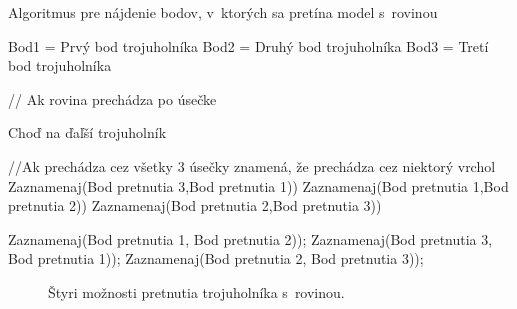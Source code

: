 \begin{algorithm}[]
\caption{Algoritmus pre nájdenie bodov, v~ktorých sa pretína model s~rovinou}\label{FindCollides}
\begin{algorithmic}[1]
    	\State Bod1 = Prvý bod trojuholníka
    	\State Bod2 = Druhý bod trojuholníka
    	\State Bod3 = Tretí bod trojuholníka
      
        // Ak rovina prechádza po úsečke
      \EndIf
      \EndIf
      \EndIf
      
      	\State Choď na ďaľší trojuholník
      \EndIf
      
            
      //Ak prechádza cez všetky 3 úsečky znamená, že prechádza cez niektorý vrchol
        	\State Zaznamenaj(Bod pretnutia 3,Bod pretnutia 1))
        \EndIf
        	\State Zaznamenaj(Bod pretnutia 1,Bod pretnutia 2))
        \EndIf
        	\State Zaznamenaj(Bod pretnutia 2,Bod pretnutia 3))
        \EndIf
      
      \EndIf
      
            \State Zaznamenaj(Bod pretnutia 1, Bod pretnutia 2));
          \EndIf  
              \State Zaznamenaj(Bod pretnutia 3, Bod pretnutia 1));
          \EndIf
              \State Zaznamenaj(Bod pretnutia 2,  Bod pretnutia 3));
          \EndIf
      \EndIf
    \EndFor
  \EndFunction
\end{algorithmic}
\end{algorithm}

\begin{figure}[H]
\centering
{}
\caption{Štyri možnosti pretnutia trojuholníka s~rovinou.}\label{FindCollidesPic}
\end{figure}


